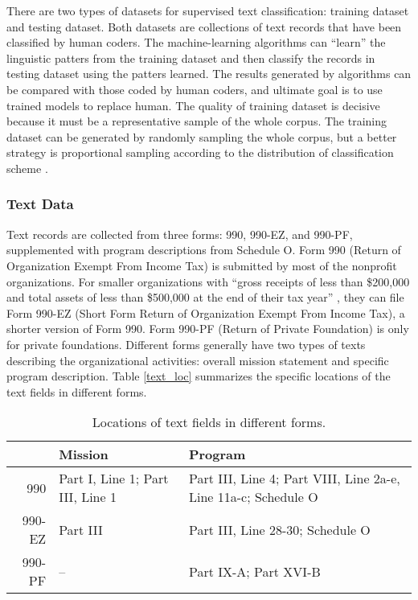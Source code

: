 \documentclass[12pt]{article}
\begin{document}
There are two types of datasets for supervised text classification: training dataset and testing dataset. Both datasets are collections of text records that have been classified by human coders. The machine-learning algorithms can ``learn'' the linguistic patters from the training dataset and then classify the records in testing dataset using the patters learned. The results generated by algorithms can be compared with those coded by human coders, and ultimate goal is to use trained models to replace human. The quality of training dataset is decisive because it must be a representative sample of the whole corpus. The training dataset can be generated by randomly sampling the whole corpus, but a better strategy is proportional sampling according to the distribution of classification scheme \parencite[278]{GrimmerTextDataPromise2013}.

\subsubsection{Text Data}

Text records are collected from three forms: 990, 990-EZ, and 990-PF, supplemented with program descriptions from Schedule O. Form 990 (Return of Organization Exempt From Income Tax) is submitted by most of the nonprofit organizations. For smaller organizations with ``gross receipts of less than \$200,000 and total assets of less than \$500,000 at the end of their tax year'' \parencite[1]{USInternalRevenueService2017InstructionsForm2018}, they can file Form 990-EZ (Short Form Return of Organization Exempt From Income Tax), a shorter version of Form 990. Form 990-PF (Return of Private Foundation) is only for private foundations. Different forms generally have two types of texts describing the organizational activities: overall mission statement and specific program description. Table \ref{text_loc} summarizes the specific locations of the text fields in different forms.

\begin{table}[]
    \centering
    \begin{tabularx}{\textwidth}{r|X|X}
         & Mission & Program \\
         \hline
         990 & Part I, Line 1; Part III, Line 1 & Part III, Line 4; Part VIII, Line 2a-e, Line 11a-c; Schedule O \\
         990-EZ & Part III & Part III, Line 28-30; Schedule O \\
         990-PF & -- & Part IX-A; Part XVI-B \\
    \end{tabularx}
    \caption{Locations of text fields in different forms.} \label{text_loc}
    \label{tab:my_label}
\end{table}
\end{document}

